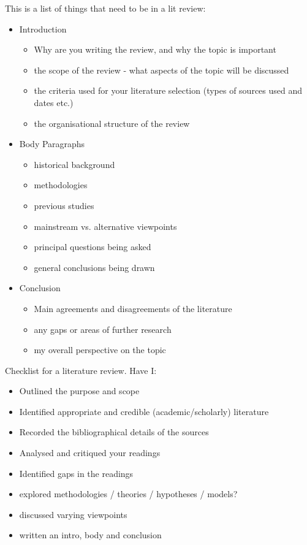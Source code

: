 \medskip
This is a list of things that need to be in a lit review:
\begin{itemize}
    \item Introduction
    \begin{itemize}
        \item Why are you writing the review, and why the topic is important
        \item the scope of the review - what aspects of the topic will be discussed
        \item the criteria used for your literature selection (types of sources used and dates etc.)
        \item the organisational structure of the review
    \end{itemize}
    \item Body Paragraphs
    \begin{itemize}
        \item historical background
        \item methodologies
        \item previous studies
        \item mainstream vs. alternative viewpoints
        \item principal questions being asked
        \item general conclusions being drawn
    \end{itemize}
    \item Conclusion 
    \begin{itemize}
        \item Main agreements and disagreements of the literature
        \item any gaps or areas of further research
        \item my overall perspective on the topic
    \end{itemize}
\end{itemize}
\medskip
Checklist for a literature review. Have I:
\begin{itemize}
    \item Outlined the purpose and scope
    \item Identified appropriate and credible (academic/scholarly) literature
    \item Recorded the bibliographical details of the sources
    \item Analysed and critiqued your readings
    \item Identified gaps in the readings
    \item explored methodologies / theories / hypotheses / models?
    \item discussed varying viewpoints
    \item written an intro, body and conclusion
\end{itemize}
